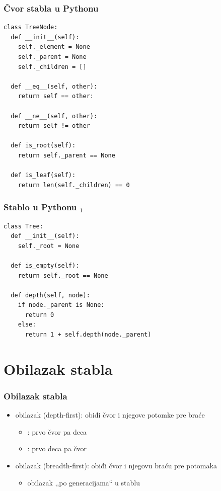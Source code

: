 \documentclass[compress,aspectratio=169]{beamer}
\begin{document}
\begin{frame}
  \frametitle{Čvor stabla u Pythonu}
\begin{verbatim}
class TreeNode:
  def __init__(self):
    self._element = None
    self._parent = None
    self._children = []
  
  def __eq__(self, other):
    return self == other:
    
  def __ne__(self, other):
    return self != other
  
  def is_root(self):
    return self._parent == None
    
  def is_leaf(self):
    return len(self._children) == 0
\end{verbatim}
\end{frame}

\begin{frame}
  \frametitle{Stablo u Pythonu $_1$}
\begin{verbatim}
class Tree:
  def __init__(self):
    self._root = None
  
  def is_empty(self):
    return self._root == None
    
  def depth(self, node):
    if node._parent is None:
      return 0
    else:
      return 1 + self.depth(node._parent)
\end{verbatim}
\end{frame}

\section[Obilazak]{Obilazak stabla}
\begin{frame}[fragile]
  \frametitle{Obilazak stabla}
  \begin{itemize}
    \item obilazak  (depth-first): obiđi čvor i njegove potomke pre braće
    \begin{itemize}
      \item {}: prvo čvor pa deca
      \item {}: prvo deca pa čvor
    \end{itemize}
    \item obilazak  (breadth-first): obiđi čvor i njegovu braću pre potomaka
    \begin{itemize}
      \item obilazak ,,po generacijama`` u stablu
    \end{itemize}
  \end{itemize}
\end{frame}
\end{document}
